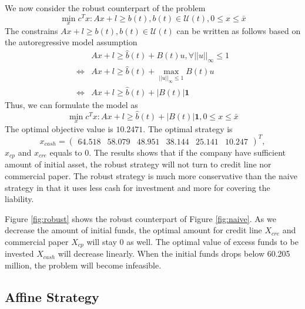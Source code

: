 \documentclass[14pt]{article}
\begin{document}
    We now consider the robust counterpart of the problem
    \begin{equation}\label{eq:robust}
	   \min_x c^Tx: Ax+l\geq b(t), b(t)\in\mathcal{U}(t) ,0\leq x\leq \bar{x}
    \end{equation}
    The constrains $Ax+l\geq b(t), b(t)\in\mathcal{U}(t)$ can be written as follows based on the autoregressive model assumption
    \[\begin{split}
        & Ax+l\geq \hat{b}(t) + B(t)u, \forall ||u||_\infty \leq 1 \\
        \iff & Ax+l\geq \hat{b}(t) + \max_{||u||_\infty \leq 1}B(t)u \\
        \iff & Ax+l\geq \hat{b}(t) + |B(t)|\textbf{1}
    \end{split}\]
    Thus, we can formulate the model as
    \begin{equation}\label{eq:robust_final}
        \min_x c^Tx: Ax+l\geq \hat{b}(t) + |B(t)|\textbf{1}, 0\leq x\leq \bar{x} 
    \end{equation}
    The optimal objective value is $10.2471$. The optimal strategy is 
    \[
        x_{cash} = 
        \begin{pmatrix}
        64.518 & 58.079 & 48.951 & 38.144 & 25.141 & 10.247
        \end{pmatrix}^T,
    \]
    $x_{cp}$ and $x_{cre}$ equals to 0. The results shows that if the company have sufficient amount of initial asset, the robust strategy will not turn to credit line nor commercial paper. The robust strategy is much more conservative than the naive strategy in that it uses less cash for investment and more for covering the liability.

    Figure \ref{fig:robust} shows the robust counterpart of Figure \ref{fig:naive}. As we decrease the amount of initial funds, the optimal amount for credit line $X_{cre}$ and commercial paper $X_{cp}$ will stay 0 as well. The optimal value of excess funds to be invested $X_{cash}$ will decrease linearly. When the initial funds drops below 60.205 million, the problem will become infeasible.


\subsection{Affine Strategy}
\end{document}
